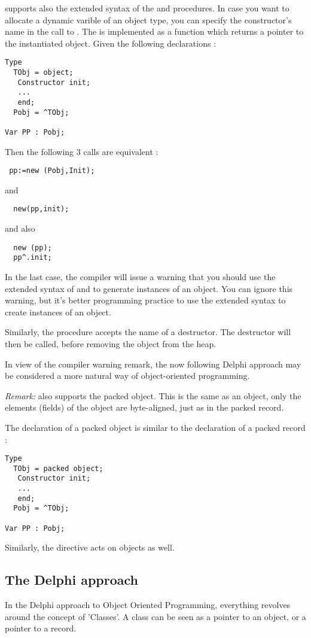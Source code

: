 \documentclass{report}
\begin{document}
\fpc supports also the extended syntax of the  and 
procedures. In case you want to allocate a dynamic varible of an object
type, you can specify the constructor's name in the call to .
The  is implemented as a function which returns a pointer to the
instantiated object. Given the following declarations :
\begin{verbatim}
Type
  TObj = object;
   Constructor init;
   ...
   end;
  Pobj = ^TObj;

Var PP : Pobj;
\end{verbatim}  
Then the following 3 calls are equivalent :
\begin{verbatim}
 pp:=new (Pobj,Init);
\end{verbatim}
and
\begin{verbatim}
  new(pp,init);
\end{verbatim}
and also
\begin{verbatim}
  new (pp);
  pp^.init;
\end{verbatim}
In the last case, the compiler will issue a warning that you should use the
extended syntax of  and  to generate instances of an
object. You can ignore this warning, but it's better programming practice to
use the extended syntax to create instances of an object.

Similarly, the  procedure accepts the name of a destructor. The
destructor will then be called, before removing the object from the heap.

In view of the compiler warning remark, the now following Delphi approach may 
be considered a more natural way of object-oriented programming.

{\em Remark:}
\fpc also supports the packed object. This is the same as an object, only 
the elements (fields) of the object are byte-aligned, just as in the packed
record.

The declaration of a packed object is similar to the declaration
of a packed record :
\begin{verbatim}
Type
  TObj = packed object;
   Constructor init;
   ...
   end;
  Pobj = ^TObj;

Var PP : Pobj;
\end{verbatim}  
Similarly, the  directive acts on objects as well.

\subsection{The Delphi approach}
In the Delphi approach to Object Oriented Programming, everything revolves
around  the concept of 'Classes'. 
A class can be seen as a pointer to an object, or a pointer to a record. 
\end{document}
